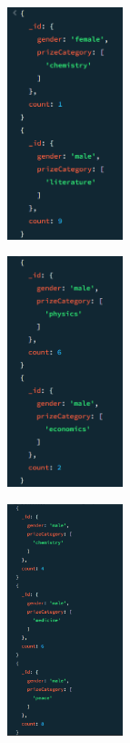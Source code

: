 \documentclass{article}
\begin{document}
\begin{multicols*}{3}
    \begin{figure}[H]
        \includegraphics[width=0.3\textwidth]{images/q5a.png}
    \end{figure}

    \columnbreak

    \begin{figure}[H]
        \includegraphics[width=0.3\textwidth]{images/q5b.png}
    \end{figure}

    \columnbreak

    \begin{figure}[H]
        \includegraphics[width=0.3\textwidth]{images/q5c.png}
    \end{figure}
\end{multicols*}
\end{document}
